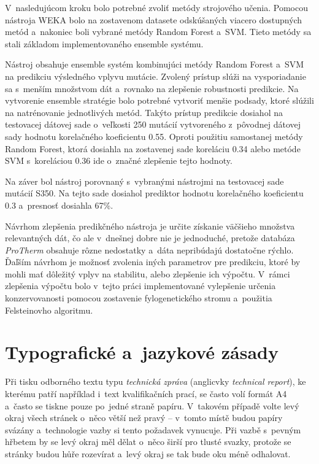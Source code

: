 V~nasledujúcom kroku bolo potrebné zvoliť metódy strojového učenia. Pomocou nástroja WEKA bolo na zostavenom datasete odskúšaných viacero dostupných metód a~nakoniec boli vybrané metódy Random Forest a~SVM. Tieto metódy sa stali základom implementovaného ensemble systému.

Nástroj obsahuje ensemble systém kombinujúci metódy Random Forest a~SVM na predikciu výsledného vplyvu mutácie. Zvolený prístup slúži na vysporiadanie sa s~menším množstvom dát a~rovnako na zlepšenie robustnosti predikcie. 
Na vytvorenie ensemble stratégie bolo potrebné vytvoriť menšie podsady, ktoré slúžili na natrénovanie jednotlivých metód. Takýto prístup predikcie dosiahol na testovacej dátovej sade o~veľkosti 250 mutácií vytvoreného z~pôvodnej dátovej sady hodnotu korelačného koeficientu 0.55. Oproti použitiu samostanej metódy Random Forest, ktorá dosiahla na zostavenej sade koreláciu 0.34 alebo metóde SVM s~koreláciou 0.36 ide o~značné zlepšenie tejto hodnoty.

Na záver bol nástroj porovnaný s~vybranými nástrojmi na testovacej sade mutácií S350. Na tejto sade dosiahol prediktor hodnotu korelačného koeficientu 0.3 a~presnosť dosiahla 67\%.

Návrhom zlepšenia predikčného nástroja je určite získanie väčšieho množstva relevantných dát, čo ale v~dnešnej dobre nie je jednoduché, pretože databáza \textit{ProTherm} obsahuje rôzne nedostatky a~dáta nepribúdajú dostatočne rýchlo. 
Ďaľším návrhom je možnosť zvolenia iných parametrov pre predikciu, ktoré by mohli mať dôležitý vplyv na stabilitu, alebo zlepšenie ich výpočtu. V~rámci zlepšenia výpočtu bolo v~tejto práci implementované vylepšenie určenia konzervovanosti pomocou zostavenie fylogenetického stromu a~použitia Felsteinovho algoritmu.






\chapter{Typografické a~jazykové zásady}
Při tisku odborného textu typu {\it technická zpráva} (anglicvky {\it technical report}), ke kterému patří například i~text kvalifikačních prací, se často volí formát A4 a~často se tiskne pouze po~jedné straně papíru. V~takovém případě volte levý okraj všech stránek o~něco větší než pravý -- v~tomto místě budou papíry svázány a~technologie vazby si tento požadavek vynucuje. Při vazbě s~pevným hřbetem by se levý okraj měl dělat o~něco širší pro tlusté svazky, protože se stránky budou hůře rozevírat a~levý okraj se tak bude oku méně odhalovat.

